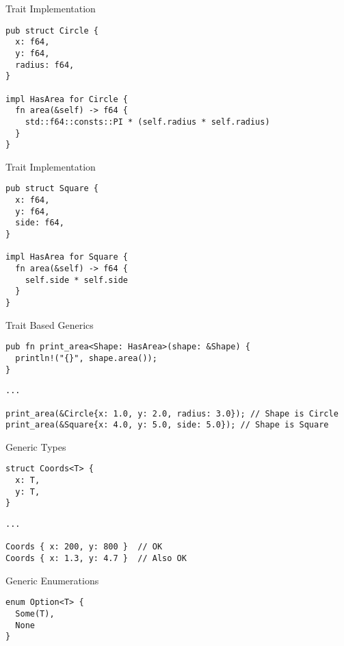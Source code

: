 
\begin{frame}[fragile]{Trait Implementation}
\begin{verbatim}
pub struct Circle {
  x: f64,
  y: f64,
  radius: f64,
}

impl HasArea for Circle {
  fn area(&self) -> f64 {
    std::f64::consts::PI * (self.radius * self.radius)
  }
}
\end{verbatim}
\end{frame}

\begin{frame}[fragile]{Trait Implementation}
\begin{verbatim}
pub struct Square {
  x: f64,
  y: f64,
  side: f64,
}

impl HasArea for Square {
  fn area(&self) -> f64 {
    self.side * self.side
  }
}
\end{verbatim}
\end{frame}


\begin{frame}[fragile]{Trait Based Generics}

\begin{verbatim}
pub fn print_area<Shape: HasArea>(shape: &Shape) {
  println!("{}", shape.area());
}
\end{verbatim}
\pause
\begin{verbatim}
...

print_area(&Circle{x: 1.0, y: 2.0, radius: 3.0}); // Shape is Circle
print_area(&Square{x: 4.0, y: 5.0, side: 5.0}); // Shape is Square
\end{verbatim}

\end{frame}


\begin{frame}[fragile]{Generic Types}
\begin{verbatim}
struct Coords<T> {
  x: T,
  y: T,
}
\end{verbatim}
\pause
\begin{verbatim}
...

Coords { x: 200, y: 800 }  // OK
Coords { x: 1.3, y: 4.7 }  // Also OK
\end{verbatim}
\end{frame}


\begin{frame}[fragile]{ Generic Enumerations}
\begin{verbatim}
enum Option<T> {
  Some(T),
  None
}
\end{verbatim}
\end{frame}

